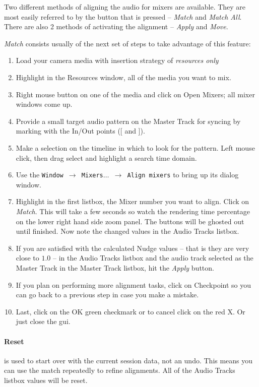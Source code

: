 Two different methods of aligning the audio for mixers are available. They are most easily referred to by the button that is pressed -- \textit{Match} and \textit{Match All}. There are also 2 methods of activating the alignment -- \textit{Apply} and \textit{Move}.  

\textit{Match} consists usually of the next set of steps to take advantage of this feature:

\begin{enumerate}
    \item Load your camera media with insertion strategy of \textit{resources only}
    \item Highlight in the Resources window, all of the media you want to mix.
    \item Right mouse button on one of the media and click on Open Mixers; all mixer windows come up.
    \item Provide a small target audio pattern on the Master Track for syncing by marking with the In/Out points ([ and ]).
    \item Make a selection on the timeline in which to look for the pattern. Left mouse click, then drag select and highlight a search time domain.
    \item Use the \texttt{Window $\rightarrow$ Mixers$\dots$ $\rightarrow$  Align mixers} to bring up its dialog window.
    \item Highlight in the first listbox, the Mixer number you want to align. Click on \textit{Match}. This will take a few seconds so watch the rendering time percentage on the lower right hand side zoom panel. The buttons will be ghosted out until finished. Now note the changed values in the Audio Tracks listbox.
    \item If you are satisfied with the calculated Nudge values -- that is they are very close to $1.0$ -- in the Audio Tracks listbox and the audio track selected as the Master Track in the Master Track listbox, hit the \textit{Apply} button.
    \item If you plan on performing more alignment tasks, click on Checkpoint so you can go back to a previous step in case you make a mistake.
    \item Last, click on the OK green checkmark or to cancel click on the red X.  Or just close the gui.
\end{enumerate}

\paragraph{Reset} is used to start over with the current session data, not an undo.  This means you can use the match repeatedly to refine alignments.  All of the Audio Tracks listbox values will be reset.

